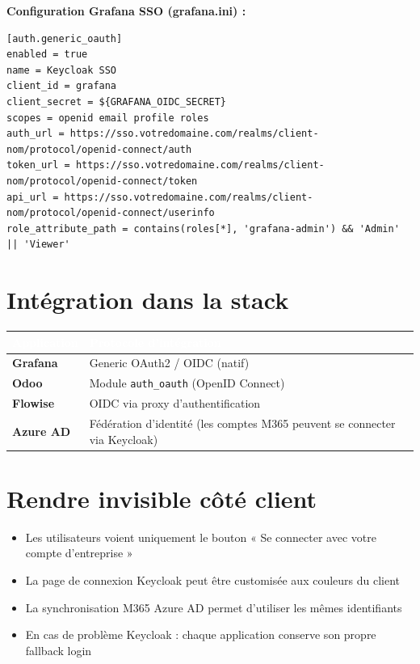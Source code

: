 \documentclass[11pt, a4paper]{article}
\begin{document}
\textbf{Configuration Grafana SSO (grafana.ini) :}
\begin{lstlisting}[style=yamlstyle]
[auth.generic_oauth]
enabled = true
name = Keycloak SSO
client_id = grafana
client_secret = ${GRAFANA_OIDC_SECRET}
scopes = openid email profile roles
auth_url = https://sso.votredomaine.com/realms/client-nom/protocol/openid-connect/auth
token_url = https://sso.votredomaine.com/realms/client-nom/protocol/openid-connect/token
api_url = https://sso.votredomaine.com/realms/client-nom/protocol/openid-connect/userinfo
role_attribute_path = contains(roles[*], 'grafana-admin') && 'Admin' || 'Viewer'
\end{lstlisting}

\section{Intégration dans la stack}

\begin{center}
\renewcommand{\arraystretch}{1.4}
\begin{tabularx}{\linewidth}{>{\bfseries}p{2.8cm} X}
\toprule
\rowcolor{tabheader}
\textcolor{white}{\textbf{Application}} & \textcolor{white}{\textbf{Protocole d'intégration}} \\
\midrule
Grafana & Generic OAuth2 / OIDC (natif) \\
\rowcolor{rowgray}
Odoo & Module \texttt{auth\_oauth} (OpenID Connect) \\
Flowise & OIDC via proxy d'authentification \\
\rowcolor{rowgray}
Azure AD & Fédération d'identité (les comptes M365 peuvent se connecter via Keycloak) \\
\bottomrule
\end{tabularx}
\end{center}

\section{Rendre invisible côté client}

\begin{itemize}
  \item Les utilisateurs voient uniquement le bouton « Se connecter avec votre compte d'entreprise »
  \item La page de connexion Keycloak peut être customisée aux couleurs du client
  \item La synchronisation M365 Azure AD permet d'utiliser les mêmes identifiants
  \item En cas de problème Keycloak : chaque application conserve son propre fallback login
\end{itemize}
\end{document}
